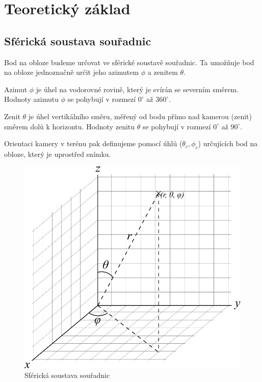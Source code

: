 \chapter{Teoretický základ}
\section{Sférická soustava souřadnic}
Bod na obloze budeme určovat ve sférické soustavě souřadnic.
Ta umožňuje bod na obloze jednoznačně určit jeho azimutem $\phi$ a zenitem $\theta$.

\begin{definice}[Azimut]\label{def01:1}
  Azimut $\phi$ je úhel na vodorovné rovině, který je svírán se severním směrem. Hodnoty azimutu $\phi$ se pohybují v rozmezí $0^\circ$ až $360^\circ$.
\end{definice}

\begin{definice}[Zenit]\label{def01:2}
  Zenit $\theta$ je úhel vertikálního směru, měřený od bodu přímo nad kamerou (zenit) směrem dolů k horizontu. Hodnoty zenitu $\theta$ se pohybují v rozmezí $0^\circ$ až $90^\circ$.
\end{definice}

Orientaci kamery v terénu pak definujeme pomocí úhlů ($\theta_c, \phi_c$) určujících bod na obloze, který je uprostřed snímku.

\begin{figure}[h]\centering
  \includegraphics[width=130mm]{../img/spherical}
  \caption{Sférická soustava souřadnic \cite{wiki:spherical}}
\end{figure}


